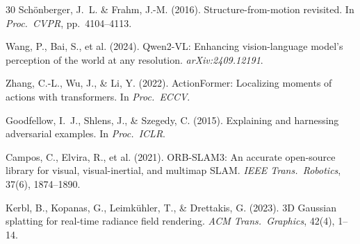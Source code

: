 \documentclass[sigconf,nonacm]{acmart}
\begin{document}
\begin{thebibliography}{30}
Sch\"{o}nberger, J.~L. \& Frahm, J.-M. (2016).
\newblock Structure-from-motion revisited.
\newblock In \textit{Proc.\ CVPR}, pp.~4104--4113.

Wang, P., Bai, S., et al. (2024).
\newblock Qwen2-VL: Enhancing vision-language model's perception of the world at any resolution.
\newblock \textit{arXiv:2409.12191}.

Zhang, C.-L., Wu, J., \& Li, Y. (2022).
\newblock ActionFormer: Localizing moments of actions with transformers.
\newblock In \textit{Proc.\ ECCV}.

Goodfellow, I.~J., Shlens, J., \& Szegedy, C. (2015).
\newblock Explaining and harnessing adversarial examples.
\newblock In \textit{Proc.\ ICLR}.

Campos, C., Elvira, R., et al. (2021).
\newblock ORB-SLAM3: An accurate open-source library for visual, visual-inertial, and multimap SLAM.
\newblock \textit{IEEE Trans.\ Robotics}, 37(6), 1874--1890.

Kerbl, B., Kopanas, G., Leimk\"{u}hler, T., \& Drettakis, G. (2023).
\newblock 3D Gaussian splatting for real-time radiance field rendering.
\newblock \textit{ACM Trans.\ Graphics}, 42(4), 1--14.

\end{thebibliography}
\end{document}

